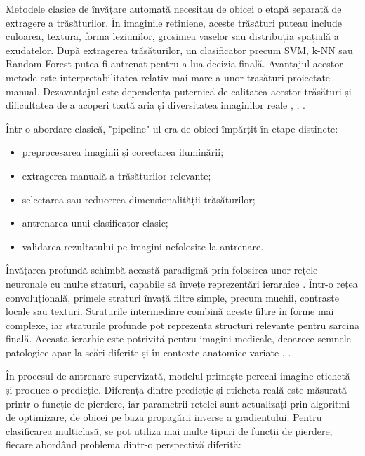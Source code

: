 \documentclass[12pt, a4paper, twoside, romanian]{teza-upb}
\begin{document}
Metodele clasice de învățare automată necesitau de obicei o etapă separată de
extragere a trăsăturilor. În imaginile retiniene, aceste trăsături puteau include culoarea, textura,
forma leziunilor, grosimea vaselor sau distribuția spațială a exudatelor. După extragerea trăsăturilor,
un clasificator precum SVM, k-NN sau Random Forest putea fi antrenat pentru
a lua decizia finală. Avantajul acestor metode este interpretabilitatea relativ mai mare
a unor trăsături proiectate manual. Dezavantajul este dependența puternică de calitatea acestor
trăsături și dificultatea de a acoperi toată aria și diversitatea imaginilor reale
\cite{1_niemeijer2005automatic}, \cite{2_sopharak2009automatic}, \cite{13_staal2004ridge}.
\bigskip

Într-o abordare clasică, "pipeline"-ul era de obicei împărțit în etape distincte:

\begin{itemize}
  \item preprocesarea imaginii și corectarea iluminării;
  \item extragerea manuală a trăsăturilor relevante;
  \item selectarea sau reducerea dimensionalității trăsăturilor;
  \item antrenarea unui clasificator clasic;
  \item validarea rezultatului pe imagini nefolosite la antrenare.
\end{itemize}

\bigskip

Învățarea profundă schimbă această paradigmă prin folosirea unor rețele neuronale cu multe
straturi, capabile să învețe reprezentări ierarhice \cite{19_lecun2015deep}. Într-o rețea convoluțională, primele straturi
învață filtre simple, precum muchii, contraste locale sau texturi. Straturile intermediare combină
aceste filtre în forme mai complexe, iar straturile profunde pot reprezenta structuri
relevante pentru sarcina finală. Această ierarhie este potrivită pentru imagini medicale, deoarece
semnele patologice apar la scări diferite și în contexte anatomice variate
\cite{19_lecun2015deep}, \cite{4_pratt2016convolutional}.
\bigskip

În procesul de antrenare supervizată, modelul primește perechi imagine-etichetă și produce o
predicție. Diferența dintre predicție și eticheta reală este măsurată printr-o funcție de
pierdere, iar parametrii rețelei sunt actualizați prin algoritmi de optimizare, de obicei
pe baza propagării inverse a gradientului. Pentru clasificarea multiclasă, se pot utiliza
mai multe tipuri de funcții de pierdere, fiecare abordând problema dintr-o perspectivă diferită:
\end{document}
